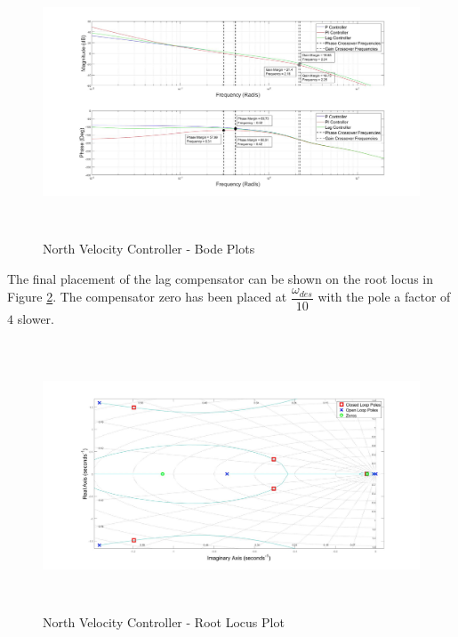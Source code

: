 \documentclass[12pt]{report}
\begin{document}
\begin{figure}[H]
	\centering
	\includegraphics[height = 8cm]{../Design/Matlab/Controllers/north_velocity_bode.jpg}
	\caption{North Velocity Controller -  Bode Plots}
	\label{IM_NorthVelControlBode}
\end{figure}

The final placement of the lag compensator can be shown on the root locus in Figure \ref{IM_NorthVelControlRoot}. The compensator zero has been placed at $\dfrac{\omega_{des}}{10}$ with the pole a factor of $4$ slower.

\begin{figure}[H]
	\centering
	\includegraphics[height = 8cm]{../Design/Matlab/Controllers/north_velocity_root.jpg}
	\caption{North Velocity Controller -  Root Locus Plot}
	\label{IM_NorthVelControlRoot}
\end{figure}	
\end{document}
